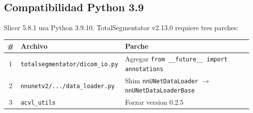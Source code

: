 \documentclass[12pt,a4paper]{article}
\begin{document}
\subsection{Compatibilidad Python 3.9}

Slicer 5.8.1 usa Python 3.9.10. TotalSegmentator v2.13.0 requiere tres parches:

\begin{table}[H]
\centering
\begin{tabular}{c l l}
\toprule
\textbf{\#} & \textbf{Archivo} & \textbf{Parche} \\
\midrule
1 & \texttt{totalsegmentator/dicom\_io.py} & Agregar \texttt{from \_\_future\_\_ import annotations} \\
2 & \texttt{nnunetv2/.../data\_loader.py} & Shim \texttt{nnUNetDataLoader} $\to$ \texttt{nnUNetDataLoaderBase} \\
3 & \texttt{acvl\_utils} & Forzar version 0.2.5 \\
\bottomrule
\end{tabular}
\end{table}
\end{document}
